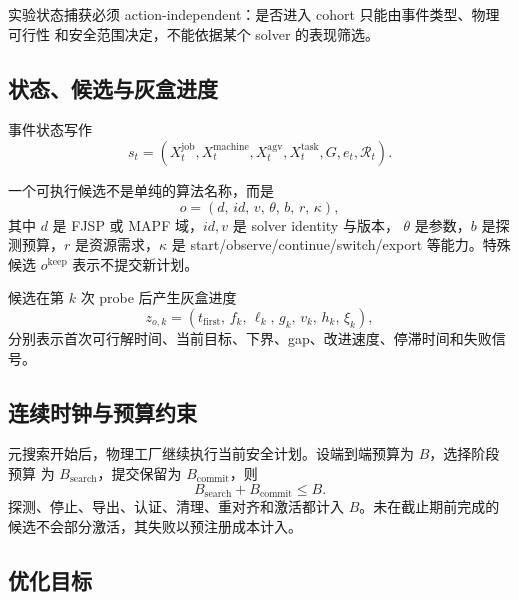 \documentclass[11pt,a4paper]{article}
\begin{document}
实验状态捕获必须 action-independent：是否进入 cohort 只能由事件类型、物理可行性
和安全范围决定，不能依据某个 solver 的表现筛选。

\subsection{状态、候选与灰盒进度}

事件状态写作
\begin{equation}
    s_t =
    \left(
    X_t^{\mathrm{job}},
    X_t^{\mathrm{machine}},
    X_t^{\mathrm{agv}},
    X_t^{\mathrm{task}},
    G,
    e_t,
    \mathcal{R}_t
    \right).
\end{equation}

一个可执行候选不是单纯的算法名称，而是
\begin{equation}
    o =
    \left(
    d,\,
    id,\,
    v,\,
    \theta,\,
    b,\,
    r,\,
    \kappa
    \right),
    \label{eq:solveroption}
\end{equation}
其中 \(d\) 是 FJSP 或 MAPF 域，\(id,v\) 是 solver identity 与版本，
\(\theta\) 是参数，\(b\) 是探测预算，\(r\) 是资源需求，\(\kappa\) 是
start/observe/continue/switch/export 等能力。特殊候选 \(o^{\mathrm{keep}}\)
表示不提交新计划。

候选在第 \(k\) 次 probe 后产生灰盒进度
\begin{equation}
    z_{o,k} =
    \left(
    t_{\mathrm{first}},\,
    f_k,\,
    \ell_k,\,
    g_k,\,
    v_k,\,
    h_k,\,
    \xi_k
    \right),
\end{equation}
分别表示首次可行解时间、当前目标、下界、gap、改进速度、停滞时间和失败信号。

\subsection{连续时钟与预算约束}

元搜索开始后，物理工厂继续执行当前安全计划。设端到端预算为 \(B\)，选择阶段预算
为 \(B_{\mathrm{search}}\)，提交保留为 \(B_{\mathrm{commit}}\)，则
\begin{equation}
    B_{\mathrm{search}} + B_{\mathrm{commit}} \le B.
\end{equation}
探测、停止、导出、认证、清理、重对齐和激活都计入 \(B\)。未在截止期前完成的
候选不会部分激活，其失败以预注册成本计入。

\subsection{优化目标}
\end{document}
